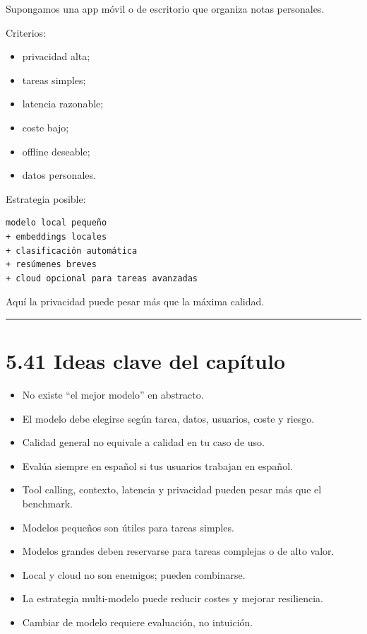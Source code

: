 Supongamos una app móvil o de escritorio que organiza notas personales.

Criterios:

\begin{itemize}
\tightlist
\item
  privacidad alta;
\item
  tareas simples;
\item
  latencia razonable;
\item
  coste bajo;
\item
  offline deseable;
\item
  datos personales.
\end{itemize}

Estrategia posible:

\begin{lstlisting}
modelo local pequeño
+ embeddings locales
+ clasificación automática
+ resúmenes breves
+ cloud opcional para tareas avanzadas
\end{lstlisting}

Aquí la privacidad puede pesar más que la máxima calidad.

\begin{center}\rule{0.5\linewidth}{0.5pt}\end{center}

\section{5.41 Ideas clave del
capítulo}\label{ideas-clave-del-capuxedtulo-4}

\begin{itemize}
\tightlist
\item
  No existe ``el mejor modelo'' en abstracto.
\item
  El modelo debe elegirse según tarea, datos, usuarios, coste y riesgo.
\item
  Calidad general no equivale a calidad en tu caso de uso.
\item
  Evalúa siempre en español si tus usuarios trabajan en español.
\item
  Tool calling, contexto, latencia y privacidad pueden pesar más que el
  benchmark.
\item
  Modelos pequeños son útiles para tareas simples.
\item
  Modelos grandes deben reservarse para tareas complejas o de alto
  valor.
\item
  Local y cloud no son enemigos; pueden combinarse.
\item
  La estrategia multi-modelo puede reducir costes y mejorar resiliencia.
\item
  Cambiar de modelo requiere evaluación, no intuición.
\end{itemize}

